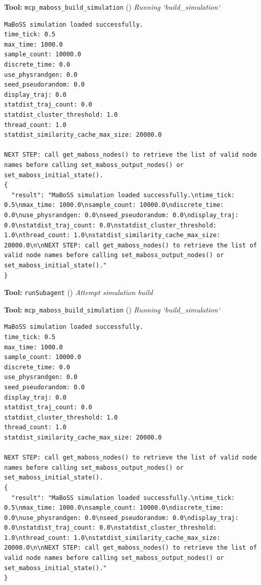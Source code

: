 \documentclass[11pt,a4paper]{article}
\begin{document}
\begin{toolokbox}
\textbf{Tool:} \texttt{mcp\_maboss\_build\_simulation} (\checkmark)
\textit{Running `build\_simulation`}
\begin{lstlisting}
MaBoSS simulation loaded successfully.
time_tick: 0.5
max_time: 1000.0
sample_count: 10000.0
discrete_time: 0.0
use_physrandgen: 0.0
seed_pseudorandom: 0.0
display_traj: 0.0
statdist_traj_count: 0.0
statdist_cluster_threshold: 1.0
thread_count: 1.0
statdist_similarity_cache_max_size: 20000.0

NEXT STEP: call get_maboss_nodes() to retrieve the list of valid node names before calling set_maboss_output_nodes() or set_maboss_initial_state().
{
  "result": "MaBoSS simulation loaded successfully.\ntime_tick: 0.5\nmax_time: 1000.0\nsample_count: 10000.0\ndiscrete_time: 0.0\nuse_physrandgen: 0.0\nseed_pseudorandom: 0.0\ndisplay_traj: 0.0\nstatdist_traj_count: 0.0\nstatdist_cluster_threshold: 1.0\nthread_count: 1.0\nstatdist_similarity_cache_max_size: 20000.0\n\nNEXT STEP: call get_maboss_nodes() to retrieve the list of valid node names before calling set_maboss_output_nodes() or set_maboss_initial_state()."
}
\end{lstlisting}
\end{toolokbox}
\begin{toolokbox}
\textbf{Tool:} \texttt{runSubagent} (\checkmark)
\textit{Attempt simulation build}
\end{toolokbox}
\begin{toolokbox}
\textbf{Tool:} \texttt{mcp\_maboss\_build\_simulation} (\checkmark)
\textit{Running `build\_simulation`}
\begin{lstlisting}
MaBoSS simulation loaded successfully.
time_tick: 0.5
max_time: 1000.0
sample_count: 10000.0
discrete_time: 0.0
use_physrandgen: 0.0
seed_pseudorandom: 0.0
display_traj: 0.0
statdist_traj_count: 0.0
statdist_cluster_threshold: 1.0
thread_count: 1.0
statdist_similarity_cache_max_size: 20000.0

NEXT STEP: call get_maboss_nodes() to retrieve the list of valid node names before calling set_maboss_output_nodes() or set_maboss_initial_state().
{
  "result": "MaBoSS simulation loaded successfully.\ntime_tick: 0.5\nmax_time: 1000.0\nsample_count: 10000.0\ndiscrete_time: 0.0\nuse_physrandgen: 0.0\nseed_pseudorandom: 0.0\ndisplay_traj: 0.0\nstatdist_traj_count: 0.0\nstatdist_cluster_threshold: 1.0\nthread_count: 1.0\nstatdist_similarity_cache_max_size: 20000.0\n\nNEXT STEP: call get_maboss_nodes() to retrieve the list of valid node names before calling set_maboss_output_nodes() or set_maboss_initial_state()."
}
\end{lstlisting}
\end{toolokbox}
\end{document}
